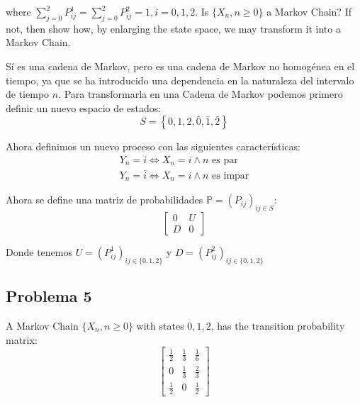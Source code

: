 \documentclass{article}
\begin{document}
            where $\sum_{j=0}^{2} P_{ij}^{1} = \sum_{j=0}^{2} P_{ij}^{2} = 1, i = 0, 1, 2$. Is $\{X_n, n\geq 0\}$ a Markov Chain? If not, then show how, by enlarging the state space, we may transform it into a Markov Chain.

            Sí es una cadena de Markov, pero es una cadena de Markov no homogénea en el tiempo, ya que se ha introducido una dependencia en la naturaleza del intervalo de tiempo $n$. Para transformarla en una Cadena de Markov podemos primero definir un nuevo espacio de estados:
            \begin{equation}
                S = \left\{0, 1, 2, \bar{0}, \bar{1}, \bar{2}\right\}
            \end{equation}

            Ahora definimos un nuevo proceso con las siguientes características:
            \begin{gather*}
                Y_n = i \Leftrightarrow X_n = i \land n \text{ es par} \\
                Y_n = \bar{i} \Leftrightarrow X_n = i \land n \text{ es impar}
            \end{gather*}

            Ahora se define una matriz de probabilidades $\mathbb{P} = (P_{ij})_{ij \in S}$:
            \begin{equation}
                \begin{bmatrix}
                    0 & U \\
                    D & 0
                \end{bmatrix}
            \end{equation}

            Donde tenemos $U = (P_{ij}^{1})_{ij \in \{0, 1, 2\}}$ y $D = (P_{ij}^{2})_{ij \in \{0, 1, 2\}}$

        \subsection*{Problema 5}

            A Markov Chain $\{X_n,n \geq 0\}$ with states $0, 1, 2$, has the transition probability matrix:
            \begin{equation}
                \begin{bmatrix}
                    \frac{1}{2} & \frac{1}{3} & \frac{1}{6} \\[2pt]
                    0 & \frac{1}{3} & \frac{2}{3} \\[2pt]
                    \frac{1}{2} & 0 & \frac{1}{2}
                \end{bmatrix}
            \end{equation}
\end{document}
